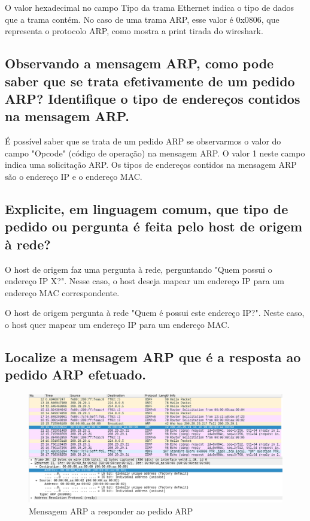 O valor hexadecimal no campo Tipo da trama Ethernet indica o tipo de dados que a trama contém. No caso de uma trama ARP, esse valor é 0x0806, que representa o protocolo ARP, como mostra a print tirada do wireshark.

\subsection{Observando a mensagem ARP, como pode saber que se trata efetivamente de um pedido ARP? Identifique o tipo de endereços contidos na mensagem ARP.}

É possível saber que se trata de um pedido ARP se observarmos o valor do campo "Opcode" (código de operação) na mensagem ARP. O valor 1 neste campo indica uma solicitação ARP. Os tipos de endereços contidos na mensagem ARP são o endereço IP e o endereço MAC.

\subsection{Explicite, em linguagem comum, que tipo de pedido ou pergunta é feita pelo host de origem à rede?}

O host de origem faz uma pergunta à rede, perguntando "Quem possui o endereço IP X?". Nesse caso, o host deseja mapear um endereço IP para um endereço MAC correspondente.

O host de origem pergunta à rede "Quem é possui este endereço IP?". Neste caso, o host quer mapear um endereço IP para um endereço MAC.

\subsection{Localize a mensagem ARP que é a resposta ao pedido ARP efetuado.}

\begin{figure} [h]
    \centering
    \includegraphics[width=0.8\linewidth]{images/resposta-arp-request.png}
    \caption{Mensagem ARP a responder ao pedido ARP}
    \label{fig:enter-label}
\end{figure}

